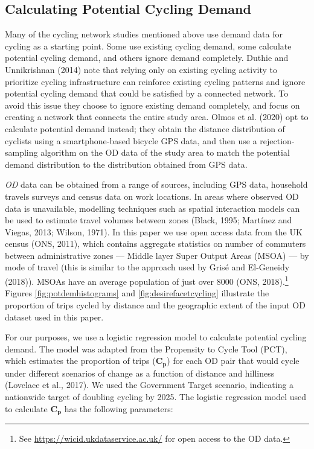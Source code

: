 \documentclass[
]{article}
\begin{document}
\hypertarget{calculating-potential-cycling-demand}{%
\subsection{Calculating Potential Cycling Demand}\label{calculating-potential-cycling-demand}}

Many of the cycling network studies mentioned above use demand data for cycling as a starting point.
Some use existing cycling demand, some calculate potential cycling demand, and others ignore demand completely.
Duthie and Unnikrishnan (2014) note that relying only on existing cycling activity to prioritize cycling infrastructure can reinforce existing cycling patterns and ignore potential cycling demand that could be satisfied by a connected network.
To avoid this issue they choose to ignore existing demand completely, and focus on creating a network that connects the entire study area.
Olmos et al. (2020) opt to calculate potential demand instead; they obtain the distance distribution of cyclists using a smartphone-based bicycle GPS data, and then use a rejection-sampling algorithm on the OD data of the study area to match the potential demand distribution to the distribution obtained from GPS data.

\emph{OD} data can be obtained from a range of sources, including GPS data, household travels surveys and census data on work locations.
In areas where observed OD data is unavailable, modelling techniques such as spatial interaction models can be used to estimate travel volumes between zones (Black, 1995; Martínez and Viegas, 2013; Wilson, 1971).
In this paper we use open access data from the UK census (ONS, 2011), which contains aggregate statistics on number of commuters between administrative zones --- Middle layer Super Output Areas (MSOA) --- by mode of travel (this is similar to the approach used by Grisé and El-Geneidy (2018)).
MSOAs have an average population of just over 8000 (ONS, 2018).\footnote{See \url{https://wicid.ukdataservice.ac.uk/} for open access to the OD data.}
Figures \ref{fig:potdemhistograms} and \ref{fig:desirefacetcycling} illustrate the proportion of trips cycled by distance and the geographic extent of the input OD dataset used in this paper.

For our purposes, we use a logistic regression model to calculate potential cycling demand.
The model was adapted from the Propensity to Cycle Tool (PCT), which estimates the proportion of trips (\(\boldsymbol{C_{p}}\)) for each OD pair that would cycle under different scenarios of change as a function of distance and hilliness (Lovelace et al., 2017).
We used the Government Target scenario, indicating a nationwide target of doubling cycling by 2025.
The logistic regression model used to calculate \(\boldsymbol{C_{p}}\) has the following parameters:
\end{document}
